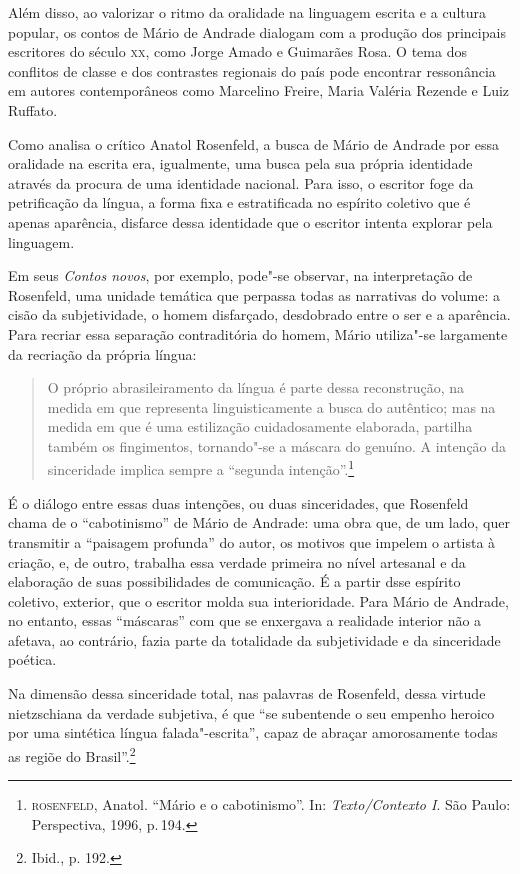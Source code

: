Além disso, ao valorizar o ritmo da oralidade na linguagem escrita e a cultura
popular, os contos de Mário de Andrade dialogam com a produção dos
principais escritores do século \textsc{xx}, como Jorge Amado e Guimarães Rosa. O
tema dos conflitos de classe e dos contrastes regionais do país pode
encontrar ressonância em autores contemporâneos como Marcelino Freire,
Maria Valéria Rezende e Luiz Ruffato.

Como analisa o crítico Anatol Rosenfeld, a busca de Mário de Andrade por essa oralidade na escrita era, igualmente, uma busca pela sua própria identidade através da procura de uma identidade nacional. Para isso, o escritor foge da petrificação da língua, a forma fixa e estratificada no espírito coletivo que é apenas aparência, disfarce dessa identidade que o escritor intenta explorar pela linguagem.

Em seus \textit{Contos novos}, por exemplo, pode"-se observar, na interpretação de Rosenfeld, uma unidade temática que perpassa todas as narrativas do volume: a cisão da subjetividade, o homem disfarçado, desdobrado entre o ser e a aparência.
Para recriar essa separação contraditória do homem, Mário utiliza"-se largamente da recriação da própria língua:

\begin{quote}
O próprio abrasileiramento da língua é parte dessa reconstrução, na medida em que representa linguisticamente a busca do autêntico; mas na medida em que é uma estilização cuidadosamente elaborada, partilha também os fingimentos, tornando"-se a máscara do genuíno. A intenção da sinceridade implica sempre a ``segunda intenção''.\footnote{\textsc{rosenfeld}, Anatol. ``Mário e o cabotinismo''. In: \textit{Texto/Contexto I}. São Paulo: Perspectiva, 1996, p.\,194.}
\end{quote}

É o diálogo entre essas duas intenções, ou duas sinceridades, que Rosenfeld chama de o ``cabotinismo'' de Mário de Andrade: uma obra que, de um lado, quer transmitir a ``paisagem profunda'' do autor, os motivos que impelem o artista à criação, e, de outro, trabalha essa verdade primeira no nível artesanal e da elaboração de suas possibilidades de comunicação. É a partir dsse espírito coletivo, exterior,
que o escritor molda sua interioridade. Para Mário de Andrade, no entanto, essas ``máscaras'' com que se enxergava a realidade interior não a afetava, ao contrário, fazia parte da totalidade da subjetividade e da sinceridade poética.

Na dimensão dessa sinceridade total, nas palavras de Rosenfeld, dessa virtude nietzschiana da verdade subjetiva, é que ``se subentende o seu empenho heroico por uma sintética língua falada"-escrita'', capaz de abraçar amorosamente todas as regiõe do Brasil''.\footnote{Ibid., p. 192.}


